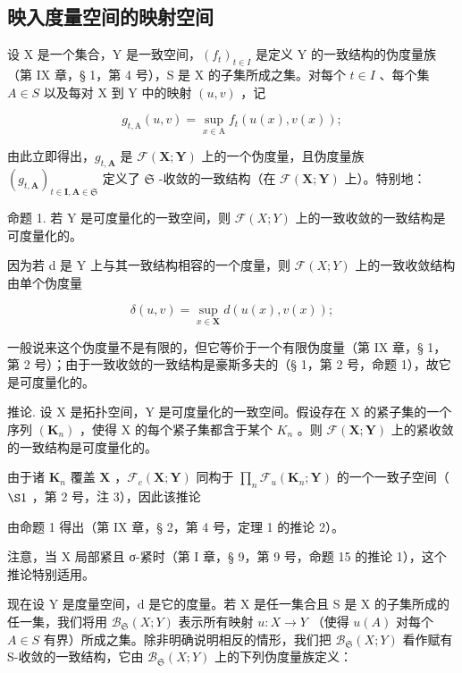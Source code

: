 \subsection{映入度量空间的映射空间}

设 X 是一个集合，Y 是一致空间，\((f_{t})_{t\in I}\) 是定义 Y 的一致结构的伪度量族（第 IX 章，§ 1，第 4 号），S 是 X 的子集所成之集。对每个 \(t\in I\) 、每个集 \(A\in S\) 以及每对 X 到 Y 中的映射 \((u,v)\) ，记

\[
g _ {t, \mathrm{A}} (u, v) = \sup _ {x \in \mathrm{A}} f _ {t} (u (x), v (x));
\]

由此立即得出，\(g_{t,\mathbf{A}}\) 是 \(\mathcal{F}(\mathbf{X};\mathbf{Y})\) 上的一个伪度量，且伪度量族 \((g_{t,\mathbf{A}})_{t\in \mathbf{I},\mathbf{A}\in \mathfrak{S}}\) 定义了 \(\mathfrak{S}\) -收敛的一致结构（在 \(\mathcal{F}(\mathbf{X};\mathbf{Y})\) 上）。特别地：

命题 1. 若 Y 是可度量化的一致空间，则 \(\mathcal{F}(X;Y)\) 上的一致收敛的一致结构是可度量化的。

因为若 d 是 Y 上与其一致结构相容的一个度量，则 \(\mathcal{F}(X;Y)\) 上的一致收敛结构由单个伪度量

\[
\delta (u, v) = \sup _ {x \in \mathbf {X}} d (u (x), v (x));
\]

一般说来这个伪度量不是有限的，但它等价于一个有限伪度量（第 IX 章，§ 1，第 2 号）；由于一致收敛的一致结构是豪斯多夫的（§ 1，第 2 号，命题 1），故它是可度量化的。

推论. 设 X 是拓扑空间，Y 是可度量化的一致空间。假设存在 X 的紧子集的一个序列 \((\mathbf{K}_{n})\) ，使得 X 的每个紧子集都含于某个 \(K_{n}\) 。则 \(\mathcal{F}(\mathbf{X};\mathbf{Y})\) 上的紧收敛的一致结构是可度量化的。

由于诸 \(\mathbf{K}_n\) 覆盖 \(\mathbf{X}\) ，\(\mathcal{F}_c(\mathbf{X};\mathbf{Y})\) 同构于 \(\prod_{n}\mathcal{F}_{u}(\mathbf{K}_{n};\mathbf{Y})\) 的一个一致子空间（ \(\S 1\) ，第 2 号，注 3），因此该推论

由命题 1 得出（第 IX 章，§ 2，第 4 号，定理 1 的推论 2）。

注意，当 X 局部紧且 σ-紧时（第 I 章，§ 9，第 9 号，命题 15 的推论 1），这个推论特别适用。

现在设 Y 是度量空间，d 是它的度量。若 X 是任一集合且 S 是 X 的子集所成的任一集，我们将用 \(\mathcal{B}_{\mathfrak{S}}(X;Y)\) 表示所有映射 \(u:X\to Y\) （使得 \(u(A)\) 对每个 \(A\in S\) 有界）所成之集。除非明确说明相反的情形，我们把 \(\mathcal{B}_{\mathfrak{S}}(X;Y)\) 看作赋有 S-收敛的一致结构，它由 \(\mathcal{B}_{\mathfrak{S}}(X;Y)\) 上的下列伪度量族定义：

